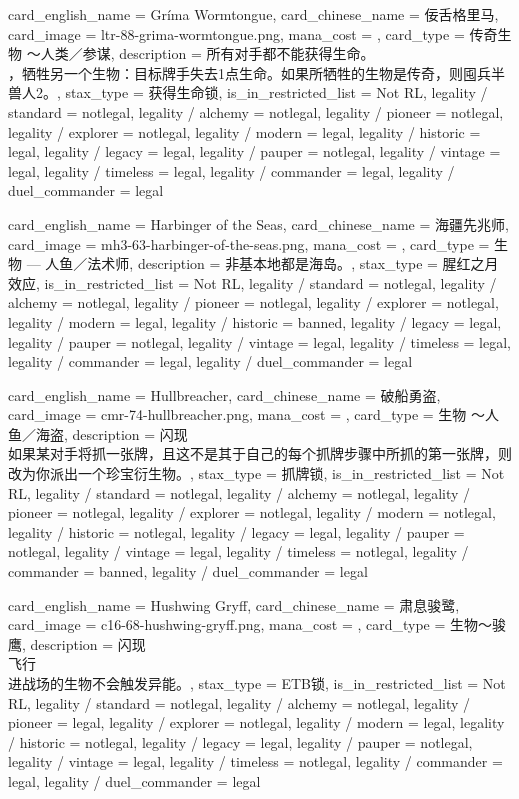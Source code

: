 \documentclass[lang = cn, color = black, 10pt]{AllThatStax}
\begin{document}
\card
{
	card_english_name = {Gríma Wormtongue},
	card_chinese_name = {佞舌格里马},
	card_image = ltr-88-grima-wormtongue.png,
	mana_cost = ,
	card_type = 传奇生物 ～人类／参谋,
	description = {所有对手都不能获得生命。\\
		，牺牲另一个生物：目标牌手失去1点生命。如果所牺牲的生物是传奇，则囤兵半兽人2。},
	stax_type = 获得生命锁,
	is_in_restricted_list = Not RL,
	legality / standard = notlegal,
	legality / alchemy = notlegal,
	legality / pioneer = notlegal,
	legality / explorer = notlegal,
	legality / modern = legal,
	legality / historic = legal,
	legality / legacy = legal,
	legality / pauper = notlegal,
	legality / vintage = legal,
	legality / timeless = legal,
	legality / commander = legal,
	legality / duel_commander = legal
}

\card
{
	card_english_name = {Harbinger of the Seas},
	card_chinese_name = {海疆先兆师},
	card_image = mh3-63-harbinger-of-the-seas.png,
	mana_cost = ,
	card_type = 生物 — 人鱼／法术师,
	description = {非基本地都是海岛。},
	stax_type = 腥红之月效应,
	is_in_restricted_list = Not RL,
	legality / standard = notlegal,
	legality / alchemy = notlegal,
	legality / pioneer = notlegal,
	legality / explorer = notlegal,
	legality / modern = legal,
	legality / historic = banned,
	legality / legacy = legal,
	legality / pauper = notlegal,
	legality / vintage = legal,
	legality / timeless = legal,
	legality / commander = legal,
	legality / duel_commander = legal
}

\card
{
	card_english_name = {Hullbreacher},
	card_chinese_name = {破船勇盗},
	card_image = cmr-74-hullbreacher.png,
	mana_cost = ,
	card_type = 生物 ～人鱼／海盗,
	description = {闪现\\
		如果某对手将抓一张牌，且这不是其于自己的每个抓牌步骤中所抓的第一张牌，则改为你派出一个珍宝衍生物。},
	stax_type = 抓牌锁,
	is_in_restricted_list = Not RL,
	legality / standard = notlegal,
	legality / alchemy = notlegal,
	legality / pioneer = notlegal,
	legality / explorer = notlegal,
	legality / modern = notlegal,
	legality / historic = notlegal,
	legality / legacy = legal,
	legality / pauper = notlegal,
	legality / vintage = legal,
	legality / timeless = notlegal,
	legality / commander = banned,
	legality / duel_commander = legal
}

\card
{
	card_english_name = {Hushwing Gryff},
	card_chinese_name = {肃息骏鹭},
	card_image = c16-68-hushwing-gryff.png,
	mana_cost = ,
	card_type = 生物～骏鹰,
	description = {闪现\\
		飞行\\
		进战场的生物不会触发异能。},
	stax_type = ETB锁,
	is_in_restricted_list = Not RL,
	legality / standard = notlegal,
	legality / alchemy = notlegal,
	legality / pioneer = legal,
	legality / explorer = notlegal,
	legality / modern = legal,
	legality / historic = notlegal,
	legality / legacy = legal,
	legality / pauper = notlegal,
	legality / vintage = legal,
	legality / timeless = notlegal,
	legality / commander = legal,
	legality / duel_commander = legal
}
\end{document}
